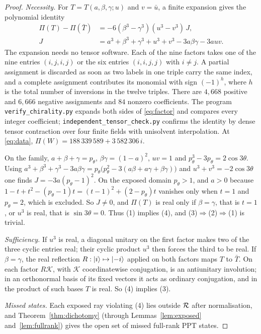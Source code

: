 \documentclass[11pt,a4paper]{article}
\theoremstyle{definition}\newtheorem{definition}[theorem]{Definition}\newtheorem*{conj}{Conjecture 9 of Shen, Chen and Bian}\newtheorem{remark}[theorem]{Remark}
\begin{document}
\begin{proof}
\emph{Necessity.} For $T=T(a,\beta,\gamma;u)$ and $v=\bar u$, a finite expansion gives the polynomial identity
\begin{align}
 \Pi(T)-\Pi(\bar T)&=-6(\beta^3-\gamma^3)(u^3-v^3)\,J,\label{eq:factor}\\
 J&=a^3+\beta^3+\gamma^3+u^3+v^3-3a\beta\gamma-3auv .\nonumber
\end{align}
The expansion needs no tensor software. Each of the nine factors takes one of the nine entries $(i,j,i,j)$ or the six entries $(i,i,j,j)$ with $i\neq j$. A partial assignment is discarded as soon as two labels in one triple carry the same index, and a complete assignment contributes its monomial with sign $(-1)^h$, where $h$ is the total number of inversions in the twelve triples. There are $4{,}668$ positive and $6{,}666$ negative assignments and $84$ nonzero coefficients. The program \texttt{verify\_chirality.py} expands both sides of \eqref{eq:factor} and compares every integer coefficient; \texttt{independent\_tensor\_check.py} confirms the identity by dense tensor contraction over four finite fields with unisolvent interpolation. At \eqref{eq:data}, $\Pi(W)=188\,339\,589+3\,582\,306\,i$.

On the family, $a+\beta+\gamma=p_\theta$, $\beta\gamma=(1-a)^2$, $uv=1$ and $p_\theta^3-3p_\theta=2\cos3\theta$. Using $a^3+\beta^3+\gamma^3-3a\beta\gamma=p_\theta\bigl(p_\theta^2-3(a\beta+a\gamma+\beta\gamma)\bigr)$ and $u^3+v^3=-2\cos3\theta$ one finds $J=-3a(p_\theta-1)^2$. On the exposed domain $p_\theta>1$, and $a>0$ because $1-t+t^2-(p_\theta-1)t=(t-1)^2+(2-p_\theta)t$ vanishes only when $t=1$ and $p_\theta=2$, which is excluded. So $J\neq0$, and $\Pi(T)$ is real only if $\beta=\gamma$, that is $t=1$, or $u^3$ is real, that is $\sin3\theta=0$. Thus (1) implies (4), and (3)$\Rightarrow$(2)$\Rightarrow$(1) is trivial.

\emph{Sufficiency.} If $u^3$ is real, a diagonal unitary on the first factor makes two of the three cyclic entries real; their cyclic product $u^3$ then forces the third to be real. If $\beta=\gamma$, the real reflection $R:\lvert i\rangle\mapsto\lvert -i\rangle$ applied on both factors maps $T$ to $\bar T$. On each factor $R\mathcal K$, with $\mathcal K$ coordinatewise conjugation, is an antiunitary involution; in an orthonormal basis of its fixed vectors it acts as ordinary conjugation, and in the product of such bases $T$ is real. So (4) implies (3).

\emph{Missed states.} Each exposed ray violating (4) lies outside $\mathcal R$ after normalisation, and Theorem~\ref{thm:dichotomy} (through Lemmas~\ref{lem:exposed} and~\ref{lem:fullrank}) gives the open set of missed full-rank PPT states.
\end{proof}
\end{document}

